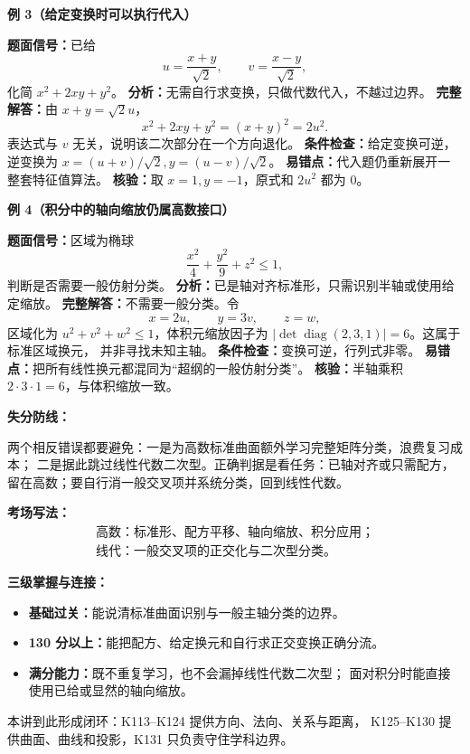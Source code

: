 \begin{knowledgeBox}
\textbf{例 3（给定变换时可以执行代入）}

\textbf{题面信号：}已给
\[
u=\frac{x+y}{\sqrt2},\qquad v=\frac{x-y}{\sqrt2},
\]
化简 \(x^2+2xy+y^2\)。
\textbf{分析：}无需自行求变换，只做代数代入，不越过边界。
\textbf{完整解答：}由 \(x+y=\sqrt2u\)，
\[
x^2+2xy+y^2=(x+y)^2=2u^2.
\]
表达式与 \(v\) 无关，说明该二次部分在一个方向退化。
\textbf{条件检查：}给定变换可逆，逆变换为
\(x=(u+v)/\sqrt2,y=(u-v)/\sqrt2\)。
\textbf{易错点：}代入题仍重新展开一整套特征值算法。
\textbf{核验：}取 \(x=1,y=-1\)，原式和 \(2u^2\) 都为 \(0\)。

\textbf{例 4（积分中的轴向缩放仍属高数接口）}

\textbf{题面信号：}区域为椭球
\[
\frac{x^2}{4}+\frac{y^2}{9}+z^2\le1,
\]
判断是否需要一般仿射分类。
\textbf{分析：}已是轴对齐标准形，只需识别半轴或使用给定缩放。
\textbf{完整解答：}不需要一般分类。令
\[
x=2u,\qquad y=3v,\qquad z=w,
\]
区域化为 \(u^2+v^2+w^2\le1\)，体积元缩放因子为
\(|\det\operatorname{diag}(2,3,1)|=6\)。这属于标准区域换元，
并非寻找未知主轴。
\textbf{条件检查：}变换可逆，行列式非零。
\textbf{易错点：}把所有线性换元都混同为“超纲的一般仿射分类”。
\textbf{核验：}半轴乘积 \(2\cdot3\cdot1=6\)，与体积缩放一致。

\textbf{失分防线：}

两个相反错误都要避免：一是为高数标准曲面额外学习完整矩阵分类，浪费复习成本；
二是据此跳过线性代数二次型。正确判据是看任务：已轴对齐或只需配方，
留在高数；要自行消一般交叉项并系统分类，回到线性代数。

\textbf{考场写法：}
\[
\boxed{\begin{gathered}
\text{高数：标准形、配方平移、轴向缩放、积分应用；}\\
\text{线代：一般交叉项的正交化与二次型分类。}
\end{gathered}}
\]

\textbf{三级掌握与连接：}
\begin{itemize}
  \item \textbf{基础过关：}能说清标准曲面识别与一般主轴分类的边界。
  \item \textbf{130 分以上：}能把配方、给定换元和自行求正交变换正确分流。
  \item \textbf{满分能力：}既不重复学习，也不会漏掉线性代数二次型；
  面对积分时能直接使用已给或显然的轴向缩放。
\end{itemize}
本讲到此形成闭环：K113--K124 提供方向、法向、关系与距离，
K125--K130 提供曲面、曲线和投影，K131 只负责守住学科边界。
\end{knowledgeBox}
